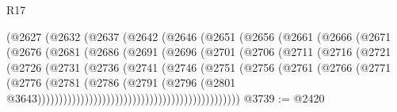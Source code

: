\begin{lexlean}{R17}
\begin{coremodule}
{{{{{{{{{{{{{{{{{{{{{{{{{{{{{{{{{{{{{{{{{{{{{{{{{{{{{{{{{{{{{{{{{{{{{{{{{{{{{{{{{{{{{{{{{{{{{{{{{{{{{{{{{{{                          (@2627
                            (@2632
                              (@2637
                                (@2642
                                  (@2646
                                    (@2651
                                      (@2656
                                        (@2661
                                          (@2666
                                            (@2671
                                              (@2676
                                                (@2681
                                                  (@2686
                                                    (@2691
                                                      (@2696
                                                        (@2701
                                                          (@2706
                                                            (@2711
                                                              (@2716
                                                                (@2721
                                                                  (@2726
                                                                    (@2731
                                                                      (@2736
                                                                        (@2741
                                                                          (@2746
                                                                            (@2751
                                                                              (@2756
                                                                                (@2761
                                                                                  (@2766
                                                                                    (@2771
                                                                                      (@2776
                                                                                        (@2781
                                                                                          (@2786
                                                                                            (@2791
                                                                                              (@2796
                                                                                                (@2801
                                                                                                  @3643)))))))))))))))))))))))))))))))))))))))))))))))
@3739 := @2420
}}}}}}}}}}}}}}}}}}}}}}}}}}}}}}}}}}}}}}}}}}}}}}}}}}}}}}}}}}}}}}}}}}}}}}}}}}}}}}}}}}}}}}}}}}}}}}}}}}}}}}}}}}}
\end{coremodule}
\end{lexlean}
